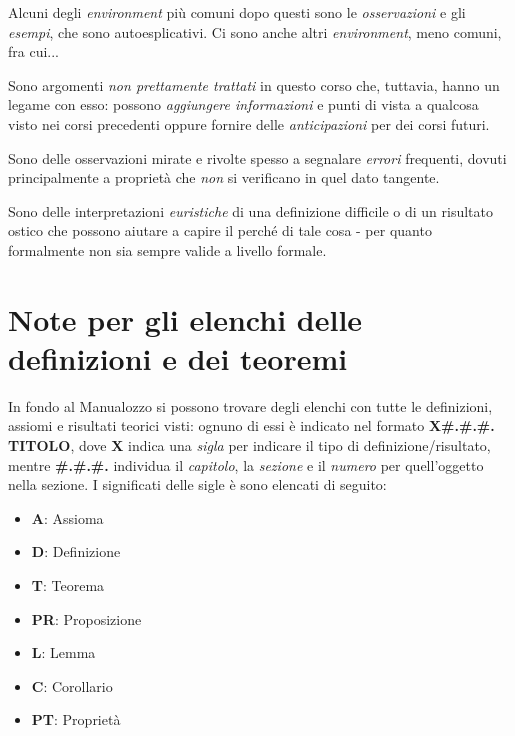 \noindent Alcuni degli \textit{environment} più comuni dopo questi sono le \textit{osservazioni} e gli \textit{esempi}, che sono autoesplicativi. Ci sono anche altri \textit{environment}, meno comuni, fra cui...
\begin{digression}
	Sono argomenti \textit{non prettamente trattati} in questo corso che, tuttavia, hanno un legame con esso: possono \textit{aggiungere informazioni} e punti di vista a qualcosa visto nei corsi precedenti oppure fornire delle \textit{anticipazioni} per dei corsi futuri.
\end{digression}
\begin{attention}
	Sono delle osservazioni mirate e rivolte spesso a segnalare \textit{errori} frequenti, dovuti principalmente a proprietà che \textit{non} si verificano in quel dato tangente. 
\end{attention}
\begin{intuit}
	Sono delle interpretazioni \textit{euristiche} di una definizione difficile o di un risultato ostico che possono aiutare a capire il perché di tale cosa - per quanto formalmente non sia sempre valide a livello formale. 
\end{intuit}
\section*{Note per gli elenchi delle definizioni e dei teoremi}
In fondo al Manualozzo si possono trovare degli elenchi con tutte le definizioni, assiomi e risultati teorici visti: ognuno di essi è indicato nel formato \textbf{\textsc{X\#.\#.\#. TITOLO}}, dove \textbf{\textsc{X}} indica una \textit{sigla} per indicare il tipo di definizione/risultato, mentre \textbf{\textsc{\#.\#.\#.}} individua il \textit{capitolo}, la \textit{sezione} e il \textit{numero} per quell'oggetto nella sezione. I significati delle sigle è sono elencati di seguito:
\begin{itemize}
	\item \textbf{\textsc{A}}: Assioma
	\item \textbf{\textsc{D}}: Definizione
	\item \textbf{\textsc{T}}: Teorema
	\item \textbf{\textsc{PR}}: Proposizione
	\item \textbf{\textsc{L}}: Lemma
	\item \textbf{\textsc{C}}: Corollario
	\item \textbf{\textsc{PT}}: Proprietà
\end{itemize}

